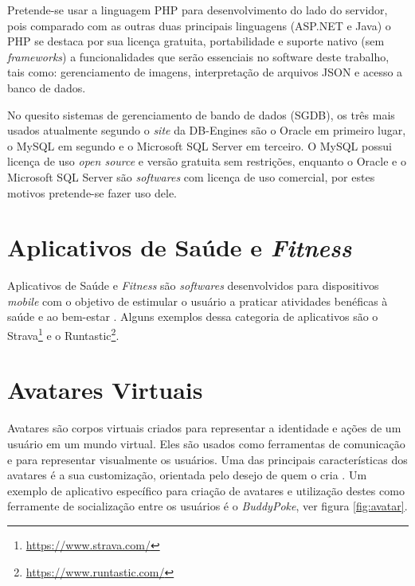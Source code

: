 Pretende-se usar a linguagem PHP para desenvolvimento do lado do servidor, pois comparado com as outras duas principais linguagens (ASP.NET e Java) o PHP se destaca por sua licença gratuita, portabilidade e suporte nativo (sem \textit{frameworks}) a funcionalidades que serão essenciais no software deste trabalho, tais como: gerenciamento de imagens, interpretação de arquivos JSON e acesso a banco de dados. \par

No quesito sistemas de gerenciamento de bando de dados (SGDB), os três mais usados atualmente segundo o \textit{site} da DB-Engines são o Oracle em primeiro lugar, o MySQL em segundo e o Microsoft SQL Server em terceiro. O MySQL possui licença de uso \textit{open source} e versão gratuita sem restrições, enquanto o Oracle e o Microsoft SQL Server são \textit{softwares} com licença de uso comercial, por estes motivos pretende-se fazer uso dele. \par

\section{Aplicativos de Saúde e \textit{Fitness}}
Aplicativos de Saúde e \textit{Fitness} são \textit{softwares} desenvolvidos para dispositivos \textit{mobile} com o objetivo de estimular o usuário a praticar atividades benéficas à saúde e ao bem-estar \cite{bonome2012}. Alguns exemplos dessa categoria de aplicativos são o Strava\footnote{\url{https://www.strava.com/}} e o  Runtastic\footnote{\url{https://www.runtastic.com/}}. \par

\section{Avatares Virtuais}
Avatares são corpos virtuais criados para representar a identidade e ações de um usuário em um mundo virtual. Eles são usados como ferramentas de comunicação e para representar visualmente os usuários. Uma das principais características dos avatares é a sua customização, orientada pelo desejo de quem o cria \cite{ducheneaut2009}. Um exemplo de aplicativo específico para criação de avatares e utilização destes como ferramente de socialização entre os usuários é o \textit{BuddyPoke}, ver figura \ref{fig:avatar}. \par

